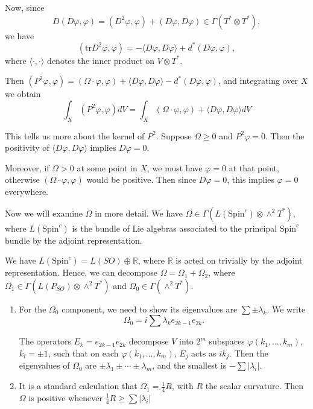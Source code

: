 \documentclass[11pt, reqno]{article}
\theoremstyle{plain}
\theoremstyle{definition}
\theoremstyle{remark}
\renewcommand{\phi}{\varphi}
\newcommand{\RR}{\mathbb{R}}
\begin{document}
Now, since
\[
    D(D\phi,\phi) = (D^2\phi,\phi) + (D\phi,D\phi) \in \Gamma(T^*\otimes T^*),
\]
we have 
\[
    (\text{tr}D^2 \phi,\phi) = - \langle D\phi,D\phi\rangle +  d^*(D\phi,\phi),
\]
where $\langle \cdot,\cdot\rangle$ denotes the inner product on $V\otimes T^*$.

Then $(P^2 \phi, \phi) = (\Omega\cdot\phi,\phi) + \langle D\phi,D\phi\rangle - d^*(D\phi,\phi)$, and integrating over $X$ we obtain
\[
    \int_X (P^2 \phi,\phi)dV = \int_X (\Omega\cdot \phi,\phi) + \langle D\phi,D\phi\rangle dV
\]

This tells us more about the kernel of $P^2$. Suppose $\Omega \geq 0$ and $P^2 \phi = 0$. Then the positivity of $\langle D\phi,D\phi\rangle$
implies $D\phi = 0$.

Moreover, if $\Omega > 0$ at some point in $X$, we must have $\phi = 0$ at that point, otherwise $(\Omega\cdot\phi,\phi)$ would be positive.
Then since $D\phi = 0$, this implies $\phi = 0$ everywhere.

Now we will examine $\Omega$ in more detail. We have $\Omega \in \Gamma(L(\text{Spin}^c)\otimes \wedge^2 T^*)$, where $L(\text{Spin}^c)$ is the
bundle of Lie algebras associated to the principal $\text{Spin}^c$ bundle by the adjoint representation. 

We have $L(\text{Spin}^c) = L(SO) \oplus \RR$, where $\RR$ is acted on trivially by the adjoint representation. Hence,
we can decompose $\Omega = \Omega_1 + \Omega_2$, where $\Omega_1 \in \Gamma(L(P_{SO})\otimes \wedge^2 T^*)$ and
$\Omega_0 \in \Gamma(\wedge^2 T^*)$. 

\begin{enumerate}
    \item For the $\Omega_0$ component, we need to show its eigenvalues are $\sum \pm \lambda_k$.
    We write
    \[
        \Omega_0 = i \sum \lambda_k e_{2k-1} e_{2k}.
    \]

    The operators $E_k = e_{2k-1} e_{2k}$ decompose $V$ into $2^m$ subspaces $\phi(k_1, \dots, k_m)$, $k_i = \pm 1$, such
    that on each $\phi(k_1,\dots,k_m)$, $E_j$ acts as $ik_j$. Then the eigenvalues of $\Omega_0$ are $\pm \lambda_1 \pm \cdots \pm \lambda_m$,
    and the smallest is $-\sum |\lambda_i|$.

    \item It is a standard calculation that $\Omega_1 = \frac{1}{4}R$, with $R$ the scalar curvature. Then $\Omega$ is positive whenever 
    $\frac{1}{4}R \geq \sum |\lambda_i|$ 
    
\end{enumerate}
\end{document}
